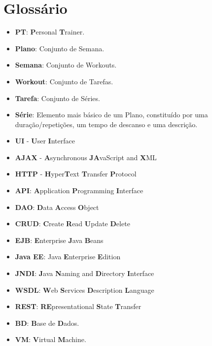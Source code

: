 \chapter{Glossário}
\label{chap:glossario}

\begin{itemize}
    \item \textbf{PT}: \textbf{P}ersonal \textbf{T}rainer.
    
    \item \textbf{Plano}: Conjunto de Semana.
    
    \item \textbf{Semana}: Conjunto de Workouts.
    
    \item \textbf{Workout}: Conjunto de Tarefas.
    
    \item \textbf{Tarefa}: Conjunto de Séries.
    
    \item \textbf{Série}: Elemento mais básico de um Plano, constituído por uma duração/repetições, um tempo de descanso e uma descrição.
    
    \item \textbf{UI} - \textbf{U}ser \textbf{I}nterface
    
    \item \textbf{AJAX} - \textbf{A}synchronous \textbf{JA}vaScript and \textbf{X}ML
    
    \item \textbf{HTTP} - \textbf{H}yper\textbf{T}ext \textbf{T}ransfer \textbf{P}rotocol
    
    \item \textbf{API}: \textbf{A}pplication \textbf{P}rogramming \textbf{I}nterface
    
    \item \textbf{DAO}: \textbf{D}ata \textbf{A}ccess \textbf{O}bject 
    
    \item \textbf{CRUD}: \textbf{C}reate \textbf{R}ead \textbf{U}pdate \textbf{D}elete 
    
    \item \textbf{EJB}: \textbf{E}nterprise \textbf{J}ava \textbf{B}eans
    
     \item \textbf{Java EE}: Java \textbf{E}nterprise \textbf{E}dition
    
    \item \textbf{JNDI}: \textbf{J}ava \textbf{N}aming and \textbf{D}irectory \textbf{I}nterface
    
    \item \textbf{WSDL}: \textbf{W}eb \textbf{S}ervices \textbf{D}escription \textbf{L}anguage
    
    \item \textbf{REST}: \textbf{RE}presentational \textbf{S}tate \textbf{T}ransfer
    
    \item \textbf{BD}: \textbf{B}ase de \textbf{D}ados.
    
    \item \textbf{VM}: \textbf{V}irtual \textbf{M}achine.
    
\end{itemize}